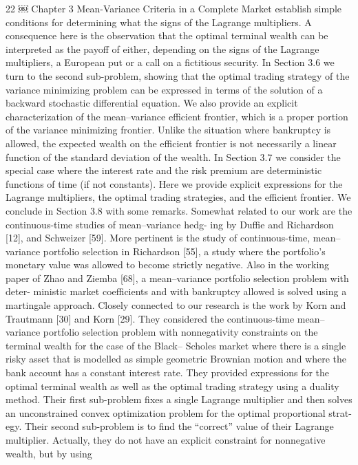 22
￼
Chapter 3 Mean-Variance Criteria in a Complete Market
establish simple conditions for determining what the signs of the Lagrange multipliers. A consequence here is the observation that the optimal terminal wealth can be interpreted as the payoff of either, depending on the signs of the Lagrange multipliers, a European put or a call on a fictitious security.
In Section 3.6 we turn to the second sub-problem, showing that the optimal trading strategy of the variance minimizing problem can be expressed in terms of the solution of a backward stochastic differential equation. We also provide an explicit characterization of the mean–variance efficient frontier, which is a proper portion of the variance minimizing frontier. Unlike the situation where bankruptcy is allowed, the expected wealth on the efficient frontier is not necessarily a linear function of the standard deviation of the wealth. In Section 3.7 we consider the special case where the interest rate and the risk premium are deterministic functions of time (if not constants). Here we provide explicit expressions for the Lagrange multipliers, the optimal trading strategies, and the efficient frontier. We conclude in Section 3.8 with some remarks.
Somewhat related to our work are the continuous-time studies of mean–variance hedg- ing by Duffie and Richardson [12], and Schweizer [59]. More pertinent is the study of continuous-time, mean–variance portfolio selection in Richardson [55], a study where the portfolio’s monetary value was allowed to become strictly negative. Also in the working paper of Zhao and Ziemba [68], a mean–variance portfolio selection problem with deter- ministic market coefficients and with bankruptcy allowed is solved using a martingale approach. Closely connected to our research is the work by Korn and Trautmann [30] and Korn [29]. They considered the continuous-time mean–variance portfolio selection problem with nonnegativity constraints on the terminal wealth for the case of the Black– Scholes market where there is a single risky asset that is modelled as simple geometric Brownian motion and where the bank account has a constant interest rate. They provided expressions for the optimal terminal wealth as well as the optimal trading strategy using a duality method. Their first sub-problem fixes a single Lagrange multiplier and then solves an unconstrained convex optimization problem for the optimal proportional strat- egy. Their second sub-problem is to find the “correct” value of their Lagrange multiplier. Actually, they do not have an explicit constraint for nonnegative wealth, but by using
